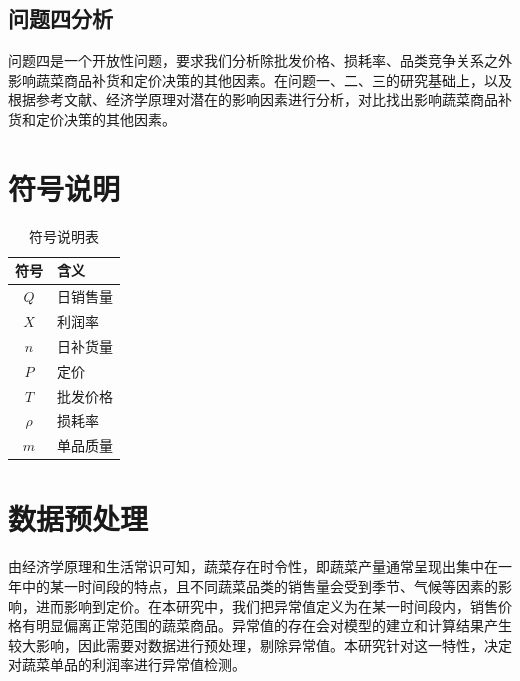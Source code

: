 \documentclass{article}
\begin{document}
\subsection{问题四分析}
问题四是一个开放性问题，要求我们分析除批发价格、损耗率、品类竞争关系之外影响蔬菜商品补货和定价决策的其他因素。在问题一、二、三的研究基础上，以及根据参考文献、经济学原理对潜在的影响因素进行分析，对比找出影响蔬菜商品补货和定价决策的其他因素。
\section{符号说明}
\begin{table}[H]
\centering
\caption{符号说明表}
\begin{tabular}{|c|l|}
\hline
符号 & 含义 \\
\hline
$Q$ & 日销售量 \\
$X$ & 利润率 \\
$n$ & 日补货量 \\
$P$ & 定价 \\
$T$ & 批发价格 \\ 
$\rho$ & 损耗率 \\
$m$ & 单品质量 \\
\hline
\end{tabular}
\end{table}
\section{数据预处理}

由经济学原理和生活常识可知，蔬菜存在时令性，即蔬菜产量通常呈现出集中在一年中的某一时间段的特点，且不同蔬菜品类的销售量会受到季节、气候等因素的影响，进而影响到定价。在本研究中，我们把异常值定义为在某一时间段内，销售价格有明显偏离正常范围的蔬菜商品。异常值的存在会对模型的建立和计算结果产生较大影响，因此需要对数据进行预处理，剔除异常值。本研究针对这一特性，决定对蔬菜单品的利润率进行异常值检测。
\end{document}
